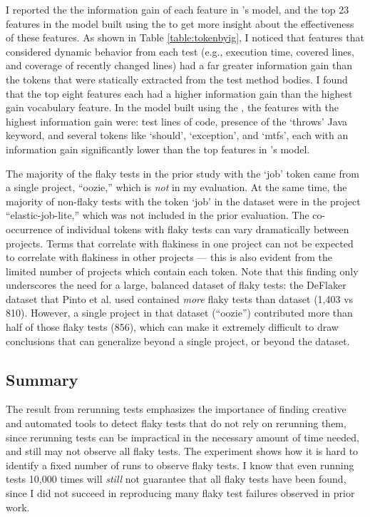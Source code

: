 I reported the the information gain of each feature in \sysName's model, and the top 23 features in the model built using the \vocabName to get more insight about the effectiveness of these features. As shown in Table \ref{table:tokenbyig}, I noticed that features that considered dynamic behavior from each test (e.g., execution time, covered lines, and coverage of recently changed lines) had a far greater information gain than the tokens that were statically extracted from the test method bodies. I found that the top eight \sysName features each had a higher information gain than the highest gain vocabulary feature. In the model built using the \vocabName \cite{pinto2020vocabulary}, the features with the highest information gain were: test lines of code, presence of the `throws' Java keyword, and several tokens like `should', `exception', and `mtfs', each with an information gain significantly lower than the top features in \sysName's model.

The majority of the flaky tests in the prior study with the `job' token came from a single project, ``oozie,'' which is \emph{not} in my evaluation. At the same time, the majority of non-flaky tests with the token `job' in the dataset were in the project ``elastic-job-lite,'' which was not included in the prior evaluation.
The co-occurrence of individual tokens with flaky tests can vary dramatically between projects. Terms that correlate with flakiness in one project can not be expected to correlate with flakiness in other projects --- this is also evident from the limited number of projects which contain each token. Note that this finding only underscores the need for a large, balanced dataset of flaky tests: the DeFlaker dataset that Pinto et al. used contained \emph{more} flaky tests than \sysName dataset (1,403 vs 810). However, a single project in that dataset (``oozie'') contributed more than half of those flaky tests (856), which can make it extremely difficult to draw conclusions that can generalize beyond a single project, or beyond the dataset.


\subsection{Summary}

The result from rerunning tests emphasizes the importance of finding creative and automated tools to detect flaky tests that do not rely on rerunning them, since rerunning tests can be impractical in the necessary amount of time needed, and still may not observe all flaky tests. The experiment shows how it is hard to identify a fixed number of runs to observe flaky tests. I know that even running tests 10,000 times will \emph{still} not guarantee that all flaky tests have been found, since I did not succeed in reproducing many flaky test failures observed in prior work.


